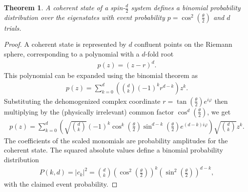 \documentclass[final,3p,mathptmx]{elsarticle}
\newtheorem{theorem}{Theorem}
\begin{document}
\endgroup
\begin{theorem}
	A coherent state of a spin-$\frac{d}{2}$ system defines a binomial probability distribution over the eigenstates with event probability $p = \cos^{2}\left( \frac{\theta}{2} \right)$ and $d$ trials.
\end{theorem} 
\begin{proof}
	A coherent state is represented by $d$ confluent points on the Riemann sphere, corresponding to a polynomial with a $d$-fold root
	\begin{align}
	p(z) = (z-r)^{d}.
	\end{align}
	This polynomial can be expanded using the binomial theorem as
	\begin{align}
	p(z) = \sum_{k = 0}^{d}\left({d \choose k}(-1)^{k}r^{d-k}\right)z^{k}.
	\end{align}
	Substituting the dehomogenized complex coordinate $r = \tan{\left( \frac{\theta}{2}\right) }e^{i\varphi}$ then multiplying by the (physically irrelevant) common factor $\cos^{d}\left( \frac{\theta}{2}\right) $, we get
	\begin{align} p(z) = \sum_{k = 0}^{d}\left({\sqrt{d \choose k}}(-1)^{k}\cos^{k}\left(\frac{\theta}{2}\right)\sin^{d-k}\left(\frac{\theta}{2}\right)e^{(d-k)i\varphi}\right)\sqrt{d \choose k}z^{k}. \end{align}
	The coefficients of the scaled monomials are probability amplitudes for the coherent state. The squared absolute values define a binomial probability distribution
	\begin{align} P(k,d) = \left| c_{k} \right|^{2} = {d \choose k}\left(\cos^{2}{\left(\frac{\theta}{2}\right)}\right)^{k}\left(\sin^{2}{\left(\frac{\theta}{2}\right)}\right)^{d-k},\end{align}
	with the claimed event probability.
\end{proof}
\end{document}

